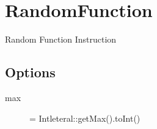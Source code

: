 \section{RandomFunction}

Random Function Instruction

\subsection{Options}
\begin{description}
\item[max] = Intleteral::getMax().toInt()
\end{description}
